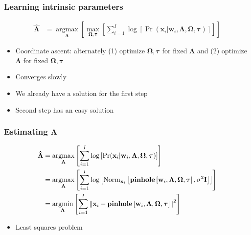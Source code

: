 \documentclass{beamer}
\begin{document}
\begin{frame}
  \frametitle{Learning intrinsic parameters}
  \begin{align*}
    \boldsymbol{\hat{\Lambda}} &=
    \underset{\boldsymbol{\Lambda}}
    {\operatorname{argmax}} \left[
    \underset{\boldsymbol{\Omega},\bm{\tau}}
    {\operatorname{max}} \left[
      \sum_{i=1}^I \log{\left[
    \Pr(\mathbf{x}_i|\mathbf{w}_i,\boldsymbol{\Lambda},\boldsymbol{\Omega},
    \bm{\tau})
      \right]}
  \right]\right]
  \end{align*}
  \begin{itemize}
    \item<2-> Coordinate ascent: alternately (1) optimize
      $\boldsymbol{\Omega}, \bm{\tau}$ for fixed $\boldsymbol{\Lambda}$ and
      (2) optimize $\boldsymbol{\Lambda}$ for fixed
      $\boldsymbol{\Omega}, \bm{\tau}$
    \item<3-> Converges slowly
    \item<4-> We already have a solution for the first step
    \item<5-> Second step has an easy solution
  \end{itemize}
\end{frame}

\begin{frame}
  \frametitle{Estimating $\boldsymbol{\Lambda}$}
  \begin{align*}
    \boldsymbol{\hat{\Lambda}}
    &=
    \underset{\boldsymbol{\Lambda}}
    {\operatorname{argmax}} \left[
      \sum_{i=1}^I \log{\left[
    \Pr(\mathbf{x}_i|\mathbf{w}_i,\boldsymbol{\Lambda},\boldsymbol{\Omega},
    \bm{\tau})
      \right]}
  \right]
\\
&=
    \underset{\boldsymbol{\Lambda}}
    {\operatorname{argmax}} \left[
      \sum_{i=1}^I \log{\left[
          \operatorname{Norm}_{\mathbf{x}_i}
          \left[
            \mathbf{pinhole}
            \left[
              \mathbf{w}_i,\boldsymbol{\Lambda},\boldsymbol{\Omega},\bm{\tau}
            \right]
            ,\sigma^2\mathbf{I}
          \right]
      \right]}
  \right]
\\
&=
    \underset{\boldsymbol{\Lambda}}
    {\operatorname{argmin}} \left[
      \sum_{i=1}^I
      \left\lVert
        \mathbf{x}_i-
            \mathbf{pinhole}
            \left[
              \mathbf{w}_i,\boldsymbol{\Lambda},\boldsymbol{\Omega},\bm{\tau}
            \right]
          \right\rVert^2
  \right]
\\
  \end{align*}
  \begin{itemize}
    \item<2-> Least squares problem
  \end{itemize}
\end{frame}
\end{document}
